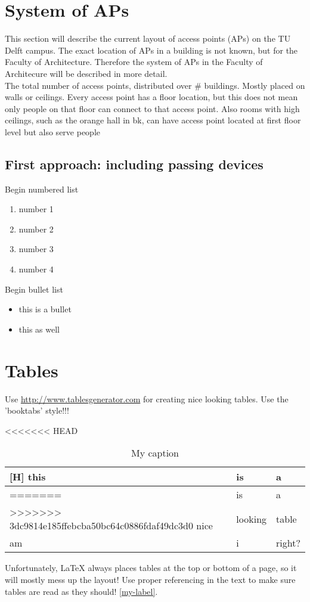 \section{System of APs}\label{systemofaps}
This section will describe the current layout of access points (APs) on the TU Delft campus. The exact location of APs in a building is not known, but for the Faculty of Architecture. Therefore the system of APs in the Faculty of Architecure will be described in more detail. 
\\
The total number of access points, distributed over # buildings. 
Mostly placed on walls or ceilings. Every access point has a floor location, but this does not mean only people on that floor can connect to that access point. Also rooms with high ceilings, such as the orange hall in bk, can have access point located at first floor level but also serve people 


\subsection{First approach: including passing devices}


Begin numbered list
\begin{enumerate}
\item number 1
\item number 2
\item number 3
\item number 4
\end{enumerate}
Begin bullet list
\begin{itemize}
\item this is a bullet
\item this as well
\end{itemize}



\section{Tables}
Use \url{http://www.tablesgenerator.com} for creating nice looking tables. Use the 'booktabs' style!!!
\begin{table}[H]
\centering
\caption{My caption}
\label{my-label}
<<<<<<< HEAD
\begin{tabular}{lll}[H]
\hline
this & is      & a      \\ \hline
=======
\begin{tabular}{@{}lll@{}}
\toprule
this & is      & a      \\ \midrule
>>>>>>> 3dc9814e185ffebcba50bc64c0886fdaf49dc3d0
nice & looking & table  \\
am   & i       & right? \\ \bottomrule
\end{tabular}
\end{table}
Unfortunately, LaTeX always places tables at the top or bottom of a page, so it will mostly mess up the layout! Use proper referencing in the text to make sure tables are read as they should! \autoref{my-label}.

